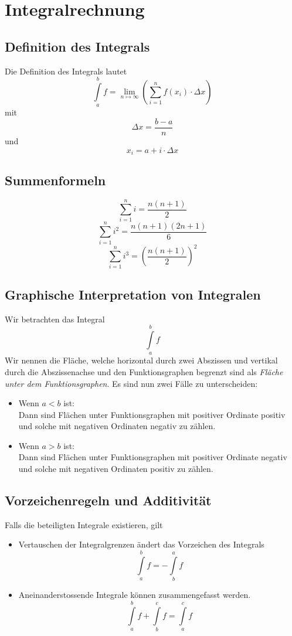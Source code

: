 \section{Integralrechnung}


\subsection{Definition des Integrals}

Die Definition des Integrals lautet
$$\int\limits_a^b f = \lim_{n \mapsto \infty}\left(\sum_{i=1}^n f(x_i) \cdot
    \Delta x\right)$$
mit
$$\Delta x = \frac{b-a}{n}$$
und
$$x_i = a + i \cdot \Delta x$$


\subsection{Summenformeln}

$$\sum_{i=1}^n i = \frac{n(n+1)}{2}$$
$$\sum_{i=1}^n i^2 = \frac{n(n+1)(2n+1)}{6}$$
$$\sum_{i=1}^n i^3 = \left(\frac{n(n+1)}{2}\right)^2$$


\subsection{Graphische Interpretation von Integralen}

Wir betrachten das Integral
$$\int\limits_a^b f$$
Wir nennen die Fläche, welche horizontal durch zwei Abszissen und vertikal
durch die Abszissenachse und den Funktionsgraphen begrenzt sind als
\emph{Fläche unter dem Funktionsgraphen}. Es sind nun zwei Fälle zu
unterscheiden:

\begin{itemize}
    \item Wenn $a < b$ ist:\\
    Dann sind Flächen unter Funktionsgraphen mit positiver Ordinate positiv und
    solche mit negativen Ordinaten negativ zu zählen.
    \item Wenn $a > b$ ist:\\
    Dann sind Flächen unter Funktionsgraphen mit positiver Ordinate negativ und
    solche mit negativen Ordinaten positiv zu zählen.
\end{itemize}


\subsection{Vorzeichenregeln und Additivität}

Falls die beteiligten Integrale existieren, gilt
\begin{itemize}
    \item Vertauschen der Integralgrenzen ändert das Vorzeichen des Integrals
    $$\int\limits_a^b f = - \int\limits_b^a f$$
    \item Aneinanderstossende Integrale können zusammengefasst werden.
    $$\int\limits_a^b f + \int\limits_b^c f = \int\limits_a^c f$$
\end{itemize}



